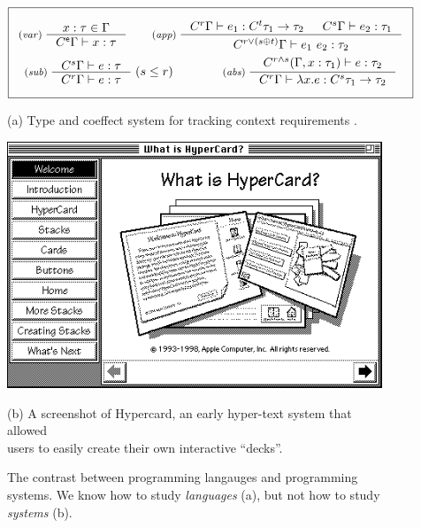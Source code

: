 \documentclass[runningheads]{llncs}
\newcommand{\ctyp}[2]{C^{#1}#2}
\newcommand{\imult}{\oplus}
\newcommand{\iunit}{\mathsf{e}}
\begin{document}
\begin{figure}[t]
\vspace{-0.5em}
\centering
\begin{equation*}
\boxed{\begin{array}{c}
\\[-0.5em]
\inference[(\emph{var})\;]
  {x : \tau \in \Gamma}
  {\ctyp{\iunit}{\Gamma} \vdash x : \tau }
%
\quad\quad
%
\inference[(\emph{app})\;]
  {\ctyp{r}{\Gamma} \vdash e_1 : \ctyp{t}{\tau_1} \rightarrow \tau_2 &
   \ctyp{s}{\Gamma} \vdash e_2 : \tau_1 }
  {\ctyp{r \vee (s \imult t)}{\Gamma} \vdash e_1~e_2 : \tau_2}
\\[1.2em]
\inference[(\emph{sub})\;]
  {\ctyp{s}{\Gamma} \vdash e : \tau }
  {\ctyp{r}{\Gamma} \vdash e : \tau }
\;(s\leq r)
%
\quad\quad\quad\quad
%
\inference[(\emph{abs})\;]
  {\ctyp{r \wedge s}{(\Gamma, x:\tau_1)} \vdash e : \tau_2}
  {\ctyp{r}{\Gamma} \vdash \lambda x.e : \ctyp{s}{\tau_1} \rightarrow \tau_2 }
\\[-0.5em]~
\end{array}}
\end{equation*}

\vspace{0.5em}
(a) Type and coeffect system for tracking context requirements \cite{petricek-2013-coeffects}.
\vspace{1.5em}

\includegraphics[scale=0.7]{figures/hyper.png}

\vspace{0.5em}
(b) A screenshot of Hypercard, an early hyper-text system that allowed \\
users to easily create their own interactive ``decks''.
\vspace{0.5em}

\caption{The contrast between programming langauges and programming systems. We know how to study \emph{languages} (a), but not how to study \emph{systems} (b). }
\label{fig:langsys}
\vspace{-0.5em}
\end{figure}
\end{document}
